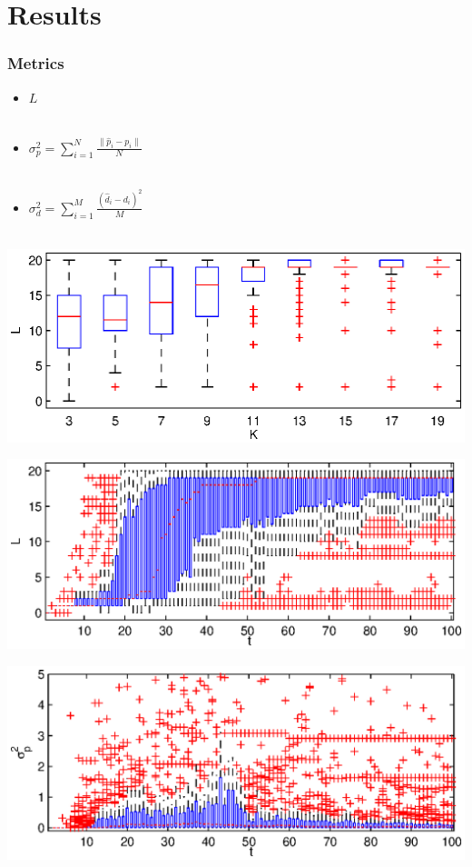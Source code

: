 \documentclass{beamer}
\begin{document}
\section{Results}
\begin{frame}
    \frametitle{Metrics}
    
    \begin{itemize}
        \item $L$ \\~
        \item $\sigma_p^2 = \sum_{i=1}^N \frac{\|\hat p_i - p_i\|}{N}$\\~
        \item $\sigma_d^2 = \sum_{i=1}^M \frac{(\hat d_i - d_i)^2}{M}$\\~
    \end{itemize}
\end{frame}

\begin{frame}
    \includegraphics[width=\columnwidth]{schemas/set1-L-nosrf.eps}
\end{frame}

\begin{frame}
    \includegraphics[width=\columnwidth]{schemas/set4-L-nosrf.eps}
\end{frame}

\begin{frame}
    \includegraphics[width=\columnwidth]{schemas/set4-sp-nosrf.eps}
\end{frame}
\end{document}
